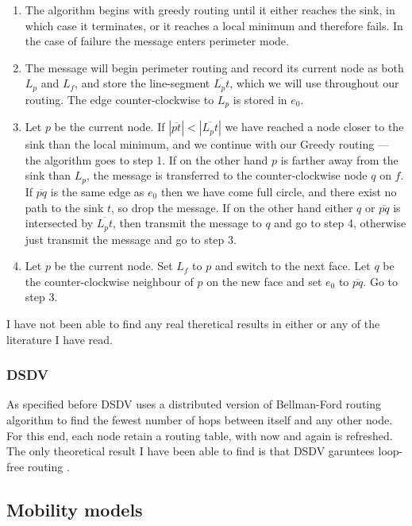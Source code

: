\begin{enumerate}
\item The algorithm begins with greedy routing until it either reaches the sink, in which case it terminates, or it reaches a local minimum and therefore fails. In the case of failure the message enters perimeter mode.

\item The message will begin perimeter routing and record its current node as both $L_p$ and $L_f$, and store the line-segment $\overline{L_pt}$, which we will use throughout our routing. The edge counter-clockwise to $L_p$ is stored in $e_0$.

\item Let $p$ be the current node. If $|\overline{pt}| < |\overline{L_pt}|$ we have reached a node closer to the sink than the local minimum, and we continue with our Greedy routing --- the algorithm goes to step 1. If on the other hand $p$ is farther away from the sink than $L_p$, the message is transferred to the counter-clockwise node $q$ on $f$. If $\overline{pq}$ is the same edge as $e_0$ then we have come full circle, and there exist no path to the sink $t$, so drop the message. If on the other hand either $q$ or $\overline{pq}$ is intersected by $\overline{L_pt}$, then transmit the message to $q$ and go to step 4, otherwise just transmit the message and go to step 3.

\item Let $p$ be the current node. Set $L_f$ to $p$ and switch to the next face. Let $q$ be the counter-clockwise neighbour of $p$ on the new face and set $e_0$ to $\overline{pq}$. Go to step 3. 
\end{enumerate}

I have not been able to find any real theretical results in either \cite{gpsr} or any of the literature I have read.

\subsubsection{DSDV}

As specified before DSDV uses a distributed version of Bellman-Ford routing algorithm to find the fewest number of hops between itself and any other node. For this end, each node retain a routing table, with now and again is refreshed. The only theoretical result I have been able to find is that DSDV garuntees loop-free routing \cite{DSDV}.

\subsection{Mobility models}
\label{section:mobili-ty_model}


